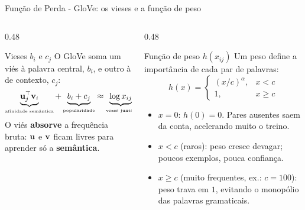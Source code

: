 \begin{frame}{Função de Perda - GloVe: os vieses e a função de peso}
    \footnotesize
    \begin{columns}[t]
        \begin{column}{0.48\textwidth}
            \begin{block}{Vieses $b_i$ e $c_j$}
                \scriptsize
                O GloVe soma um viés à palavra central, $b_i$, e outro à de contexto, $c_j$:
                \begin{equation*}
                    \underbrace{\mathbf{u}_j^\top \mathbf{v}_i}_{\text{\tiny afinidade semântica}}
                    + \underbrace{b_i + c_j}_{\text{\tiny popularidade}}
                    \approx \underbrace{\log x_{ij}}_{\text{\tiny vezes juntas}}
                \end{equation*}
                O viés \textbf{absorve} a frequência bruta: $\mathbf{u}$ e $\mathbf{v}$ ficam livres para aprender só a \textbf{semântica}.
            \end{block}
        \end{column}
        \begin{column}{0.48\textwidth}
            \begin{block}{Função de peso $h(x_{ij})$}
                \scriptsize
                Um peso define a importância de cada par de palavras:
                \begin{equation*}
                    h(x) = \begin{cases}
                        (x / c)^{\alpha}, & x < c \\
                        1, & x \ge c
                    \end{cases}
                \end{equation*}
                \begin{itemize}\setlength{\itemsep}{1pt}
                    \item $x = 0$: $h(0) = 0$. Pares ausentes saem da conta, acelerando muito o treino.
                    \item $x < c$ (raros): peso cresce devagar; poucos exemplos, pouca confiança.
                    \item $x \ge c$ (muito frequentes, ex.: $c = 100$): peso trava em $1$, evitando o monopólio das palavras gramaticais.
                \end{itemize}
            \end{block}
        \end{column}
    \end{columns}


\end{frame}
